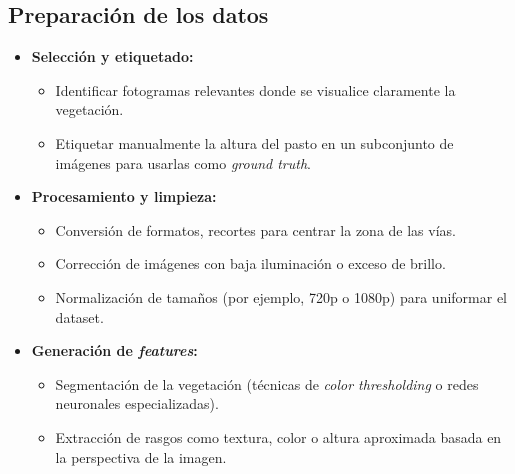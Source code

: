 \documentclass[
11pt, %
]{ProyectoVpC}
\begin{document}
\subsection{Preparación de los datos}
\begin{itemize}
  \item \textbf{Selección y etiquetado:}
    \begin{itemize}
      \item Identificar fotogramas relevantes donde se visualice claramente la vegetación.
      \item Etiquetar manualmente la altura del pasto en un subconjunto de imágenes para usarlas como \emph{ground truth}.
    \end{itemize}
  \item \textbf{Procesamiento y limpieza:}
    \begin{itemize}
      \item Conversión de formatos, recortes para centrar la zona de las vías.
      \item Corrección de imágenes con baja iluminación o exceso de brillo.
      \item Normalización de tamaños (por ejemplo, 720p o 1080p) para uniformar el dataset.
    \end{itemize}
  \item \textbf{Generación de \emph{features}:}
    \begin{itemize}
      \item Segmentación de la vegetación (técnicas de \emph{color thresholding} o redes neuronales especializadas).
      \item Extracción de rasgos como textura, color o altura aproximada basada en la perspectiva de la imagen.
    \end{itemize}
\end{itemize}
\end{document}
